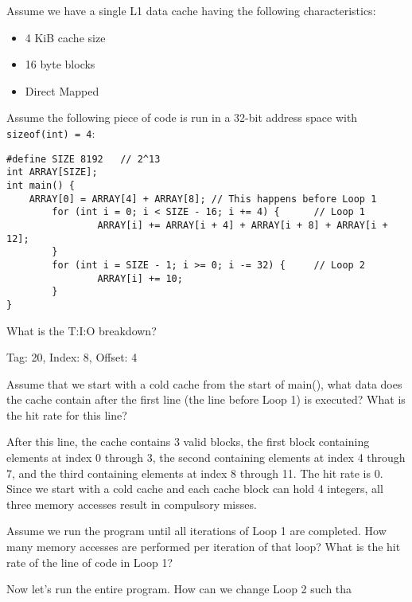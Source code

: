 \begin{blocksection}
\question
Assume we have a single L1 data cache having the following characteristics: 
\begin{itemize}
\item4 KiB cache size 
		 \item 16 byte blocks 
         \item Direct Mapped
\end{itemize}


Assume the following piece of code is run in a 32-bit address space with \lstinline$sizeof(int) = 4$:

\begin{verbatim}
#define SIZE 8192   // 2^13
int ARRAY[SIZE]; 
int main() {
    ARRAY[0] = ARRAY[4] + ARRAY[8]; // This happens before Loop 1
	    for (int i = 0; i < SIZE - 16; i += 4) {      // Loop 1
		        ARRAY[i] += ARRAY[i + 4] + ARRAY[i + 8] + ARRAY[i + 12];
	    }
	    for (int i = SIZE - 1; i >= 0; i -= 32) {     // Loop 2
		        ARRAY[i] += 10;
	    }
}

\end{verbatim}

What is the T:I:O breakdown?

\begin{solution}
Tag: 20, Index: 8, Offset: 4
\end{solution}

\question
Assume that we start with a cold cache from the start of main(), what data does the cache contain after the first line (the line before Loop 1) is executed? What is the hit rate for this line?

\begin{solution}
After this line, the cache contains 3 valid blocks, the first block containing elements at index 0 through 3, the second containing elements at index 4 through 7, and the third containing elements at index 8 through 11.
The hit rate is 0. Since we start with a cold cache and each cache block can hold 4 integers, all three memory accesses result in compulsory misses. 
\end{solution}

\question
Assume we run the program until all iterations of Loop 1 are completed. How many memory accesses are performed per iteration of that loop? What is the hit rate of the line of code in Loop 1?

\begin{solution}

\end{solution}

\question\textbf{}
Now let's run the entire program. How can we change Loop 2 such tha

\end{blocksection}